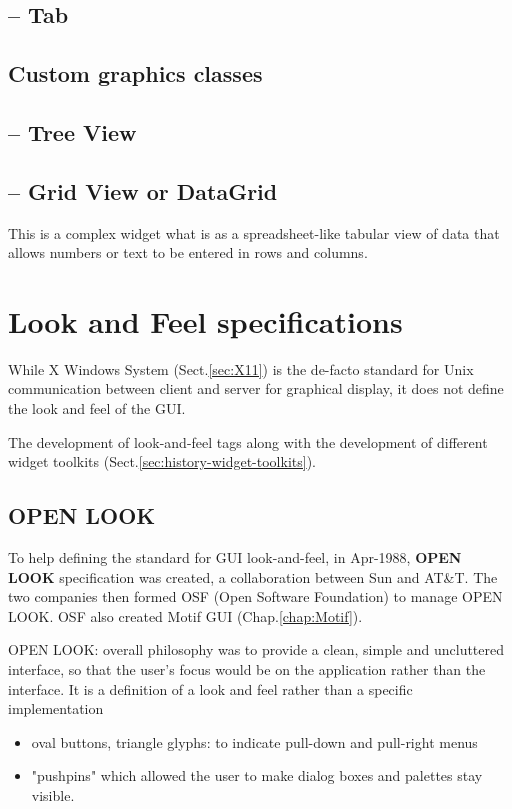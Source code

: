 \subsection{-- Tab}

\subsection{Custom graphics classes}
\label{sec:UI-custom-graphic-classes}

\subsection{-- Tree View}

\subsection{-- Grid View or DataGrid}

This is a complex widget what is as  a spreadsheet-like tabular view of data
that allows numbers or text to be entered in rows and columns.

\section{Look and Feel specifications}
\label{sec:look_and_feel_specifications}

While X Windows System (Sect.\ref{sec:X11}) is the de-facto standard for Unix
communication between client and server for graphical display, it does not
define the look and feel of the GUI. 

The development of look-and-feel tags along with the development of different
widget toolkits (Sect.\ref{sec:history-widget-toolkits}).

\subsection{OPEN LOOK}
\label{sec:OPEN_LOOK}

To help defining the standard for GUI look-and-feel, in Apr-1988, {\bf OPEN
LOOK} specification was created, a collaboration between Sun and AT\&T. The two
companies then formed OSF (Open Software Foundation) to manage OPEN LOOK.
OSF also created Motif GUI (Chap.\ref{chap:Motif}).


OPEN LOOK: overall philosophy was to provide a clean, simple and uncluttered
interface, so that the user's focus would be on the application rather than the
interface. It is a definition of a look and feel rather than a specific
implementation
\begin{itemize}
  \item oval buttons, triangle glyphs: to indicate pull-down and pull-right menus
  
  \item "pushpins" which allowed the user to make dialog boxes and palettes stay visible. 
\end{itemize}


